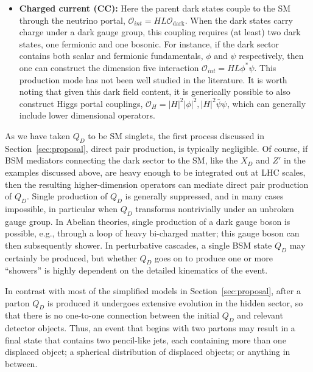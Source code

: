 \begin{itemize}
\item {\bf Charged current (CC):} Here the parent dark states couple to the SM through the neutrino portal, $\mathcal{O}_{int}=HL \mathcal{O}_{\mathrm{dark}}$. When the dark states carry charge under a dark gauge group, this coupling requires (at least) two dark states, one fermionic and one bosonic. For instance, if the dark sector contains both scalar and fermionic fundamentals, $\phi$ and $\psi$ respectively, then one can construct the dimension five interaction $\mathcal{O}_{int} = HL\phi^* \psi$. This production mode has not been well studied in the literature. It is worth noting that given this dark field content, it is generically possible to also construct Higgs portal couplings, $\mathcal{O}_H = |H| ^ 2 |\phi|^2, |H|^2\bar\psi\psi$, which can generally include lower dimensional operators.

\end{itemize}

As we have taken $Q_D$ to be SM singlets, the first process discussed in Section~\ref{sec:proposal}, direct pair production, is typically negligible. Of course, if BSM mediators connecting the dark sector to the SM, like the $X_D$ and $Z'$ in the examples discussed above, are heavy enough to be integrated out at LHC scales, then the resulting higher-dimension operators can mediate direct pair production of $Q_D$. Single production of $Q_D$ is generally suppressed, and in many cases impossible, in particular when $Q_D$ transforms nontrivially under an unbroken gauge group. In Abelian theories, single production of a dark gauge boson is possible, e.g., through a loop of heavy bi-charged matter; this gauge boson can then subsequently shower. In perturbative cascades, a single BSM state $Q_D$ may certainly be produced, but whether $Q_D$ goes on to produce one or more ``showers'' is highly dependent on the detailed kinematics of the event.

In contrast with most of the simplified models in Section~\ref{sec:proposal}, after a parton $Q_D$ is produced it undergoes extensive evolution in the hidden sector, so that there is no one-to-one connection between the initial $Q_D$ and relevant detector objects. Thus, an event that begins with two partons may result in a final state that contains two pencil-like jets, each containing more than one displaced object; a spherical distribution of displaced objects; or anything in between.

